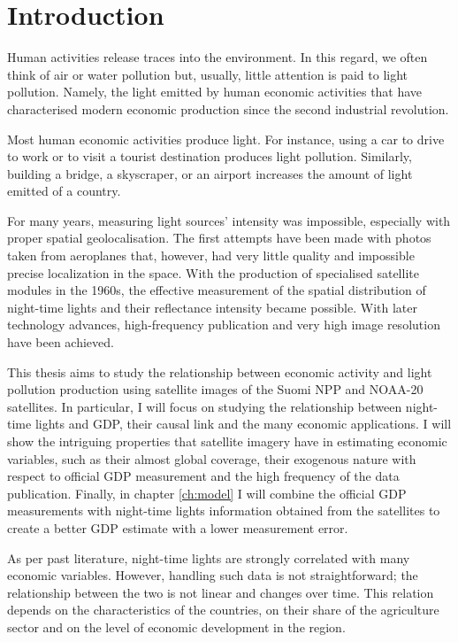 \chapter{Introduction}\label{ch:introduction}
Human activities release traces into the environment. In this regard, we often think of air or water pollution but, usually, little attention is paid to light pollution. Namely, the light emitted by human economic activities that have characterised modern economic production since the second industrial revolution.

Most human economic activities produce light. For instance, using a car to drive to work or to visit a tourist destination produces light pollution. Similarly, building a bridge, a skyscraper, or an airport increases the amount of light emitted of a country.

For many years, measuring light sources' intensity was impossible, especially with proper spatial geolocalisation. The first attempts have been made with photos taken from aeroplanes that, however, had very little quality and impossible precise localization in the space.
With the production of specialised satellite modules in the 1960s, the effective measurement of the spatial distribution of night-time lights and their reflectance intensity became possible. With later technology advances, high-frequency publication and very high image resolution have been achieved.

This thesis aims to study the relationship between economic activity and light pollution production using satellite images of the Suomi NPP and NOAA-20 satellites. In particular, I will focus on studying the relationship between night-time lights and GDP, their causal link and the many economic applications. I will show the intriguing properties that satellite imagery have in estimating economic variables, such as their almost global coverage, their exogenous nature with respect to official GDP measurement and the high frequency of the data publication.
Finally, in chapter \ref{ch:model} I will combine the official GDP measurements with night-time lights information obtained from the satellites to create a better GDP estimate with a lower measurement error.

As per past literature, night-time lights are strongly correlated with many economic variables. However, handling such data is not straightforward; the relationship between the two is not linear and changes over time. This relation depends on the characteristics of the countries, on their share of the agriculture sector and on the level of economic development in the region.

